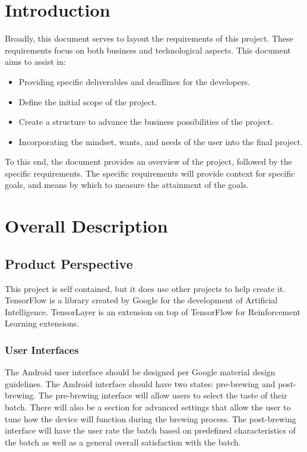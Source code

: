 \documentclass[draftclsnofoot,onecolumn,letterpaper,10pt]{IEEEtran}
\begin{document}
\section{Introduction}
Broadly, this document serves to layout the requirements of this project.
These requirements focus on both business and technological aspects.
This document aims to assist in:
\begin{itemize}
	\item Providing specific deliverables and deadlines for the developers.
	\item Define the initial scope of the project.
	\item Create a structure to advance the business possibilities of the project.
	\item Incorporating the mindset, wants, and needs of the user into the final project.
\end{itemize}
To this end, the document provides an overview of the project, followed by the specific requirements.
The specific requirements will provide context for specific goals, and means by which to 
measure the attainment of the goals.

\section{Overall Description}
\subsection{Product Perspective}
This project is self contained, but it does use other projects to help create it.
TensorFlow is a library created by Google for the development of Artificial Intelligence.
TensorLayer is an extension on top of TensorFlow for Reinforcement Learning extensions.

\subsubsection{User Interfaces}
The Android user interface should be designed per Google material design guidelines.
The Android interface should have two states: pre-brewing and post-brewing.
The pre-brewing interface will allow users to select the taste of their batch.
There will also be a section for advanced settings that allow the user to tune how the
device will function during the brewing process.
The post-brewing interface will have the user rate the batch based on predefined 
characteristics of the batch as well as a general overall satisfaction with the batch.
\end{document}
